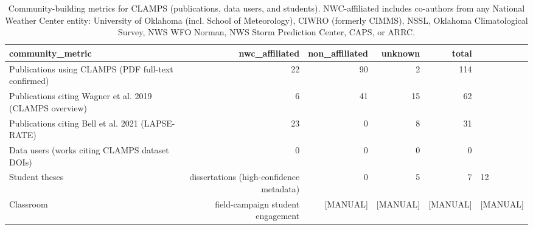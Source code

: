 \begin{table}[ht]
\centering
\caption{Community-building metrics for CLAMPS (publications, data users, and students). NWC-affiliated includes co-authors from any National Weather Center entity: University of Oklahoma (incl. School of Meteorology), CIWRO (formerly CIMMS), NSSL, Oklahoma Climatological Survey, NWS WFO Norman, NWS Storm Prediction Center, CAPS, or ARRC.}
\label{tab:community}
\small
\begin{tabular}{lrrrr}
\hline
community\_metric & nwc\_affiliated & non\_affiliated & unknown & total \\
\hline
Publications using CLAMPS (PDF full-text confirmed) & 22 & 90 & 2 & 114 \\
Publications citing Wagner et al. 2019 (CLAMPS overview) & 6 & 41 & 15 & 62 \\
Publications citing Bell et al. 2021 (LAPSE-RATE) & 23 & 0 & 8 & 31 \\
Data users (works citing CLAMPS dataset DOIs) & 0 & 0 & 0 & 0 \\
Student theses & dissertations (high-confidence metadata) & 0 & 5 & 7 & 12 \\
Classroom & field-campaign student engagement & [MANUAL] & [MANUAL] & [MANUAL] & [MANUAL] \\
\hline
\end{tabular}
\end{table}
